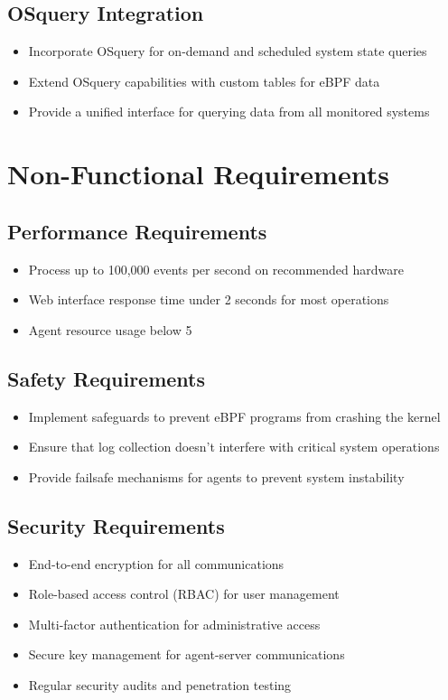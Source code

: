 \subsection{OSquery Integration}
\begin{itemize}
    \item Incorporate OSquery for on-demand and scheduled system state queries
    \item Extend OSquery capabilities with custom tables for eBPF data
    \item Provide a unified interface for querying data from all monitored systems
\end{itemize}

\section{Non-Functional Requirements}

\subsection{Performance Requirements}
\begin{itemize}
    \item Process up to 100,000 events per second on recommended hardware
    \item Web interface response time under 2 seconds for most operations
    \item Agent resource usage below 5%
\end{itemize}

\subsection{Safety Requirements}
\begin{itemize}
    \item Implement safeguards to prevent eBPF programs from crashing the kernel
    \item Ensure that log collection doesn't interfere with critical system operations
    \item Provide failsafe mechanisms for agents to prevent system instability
\end{itemize}

\subsection{Security Requirements}
\begin{itemize}
    \item End-to-end encryption for all communications
    \item Role-based access control (RBAC) for user management
    \item Multi-factor authentication for administrative access
    \item Secure key management for agent-server communications
    \item Regular security audits and penetration testing
\end{itemize}

